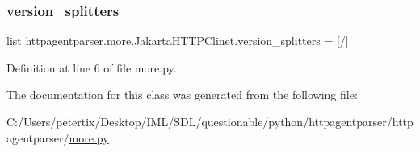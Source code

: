 \subsubsection{\texorpdfstring{version\+\_\+splitters}{version\_splitters}}
{\footnotesize\ttfamily list httpagentparser.\+more.\+Jakarta\+H\+T\+T\+P\+Clinet.\+version\+\_\+splitters = \mbox{[}\textquotesingle{}/\textquotesingle{}\mbox{]}\hspace{0.3cm}{\ttfamily [static]}}



Definition at line 6 of file more.\+py.



The documentation for this class was generated from the following file\+:\begin{DoxyCompactItemize}
\item 
C\+:/\+Users/petertix/\+Desktop/\+I\+M\+L/\+S\+D\+L/questionable/python/httpagentparser/httpagentparser/\hyperlink{more_8py}{more.\+py}\end{DoxyCompactItemize}
